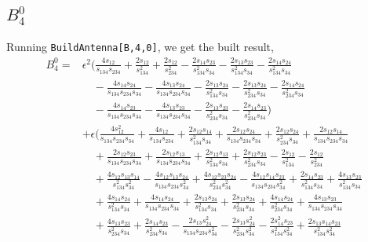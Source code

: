 \subsection{$B_4^0$}

Running \texttt{BuildAntenna[B,4,0]}, we get the built result,
\begin{align}
    B_4^0 = {}
    & \epsilon^2 \Bigg(
  \frac{4s_{12}}{s_{134}s_{234}} + \frac{2s_{12}}{s_{134}^2} + \frac{2s_{12}}{s_{234}^2} - \frac{2s_{14}s_{23}}{s_{134}^2s_{34}} - \frac{2s_{13}s_{23}}{s_{134}^2s_{34}} - \frac{2s_{14}s_{24}}{s_{134}^2s_{34}} \nonumber \\
  & \quad - \frac{4s_{14}s_{24}}{s_{134}s_{234}s_{34}} - \frac{4s_{13}s_{24}}{s_{134}s_{234}s_{34}} - \frac{2s_{13}s_{24}}{s_{134}^2s_{34}} - \frac{2s_{13}s_{24}}{s_{234}^2s_{34}} - \frac{2s_{14}s_{24}}{s_{234}^2s_{34}} \nonumber \\
  & \quad - \frac{4s_{14}s_{23}}{s_{134}s_{234}s_{34}} - \frac{4s_{13}s_{23}}{s_{134}s_{234}s_{34}} - \frac{2s_{13}s_{23}}{s_{234}^2s_{34}} - \frac{2s_{14}s_{23}}{s_{234}^2s_{34}} \Bigg) \nonumber \\
& + \epsilon \Bigg(
  \frac{4s_{12}^2}{s_{134}s_{234}s_{34}} + \frac{4s_{12}}{s_{134}s_{234}} + \frac{2s_{12}s_{14}}{s_{134}^2s_{34}} + \frac{2s_{12}s_{24}}{s_{134}s_{234}s_{34}} + \frac{2s_{12}s_{24}}{s_{234}^2s_{34}} + \frac{2s_{12}s_{14}}{s_{134}s_{234}s_{34}} \nonumber \\
  & \quad + \frac{2s_{12}s_{23}}{s_{134}s_{234}s_{34}} + \frac{2s_{12}s_{13}}{s_{134}s_{234}s_{34}} + \frac{2s_{12}s_{13}}{s_{134}^2s_{34}} + \frac{2s_{12}s_{23}}{s_{234}^2s_{34}} - \frac{2s_{12}}{s_{134}^2} - \frac{2s_{12}}{s_{234}^2} \nonumber \\
  & \quad + \frac{4s_{12}s_{13}s_{14}}{s_{134}^2s_{34}^2} - \frac{4s_{12}s_{13}s_{24}}{s_{134}s_{234}s_{34}^2} + \frac{4s_{12}s_{23}s_{24}}{s_{234}^2s_{34}^2} - \frac{4s_{12}s_{14}s_{23}}{s_{134}s_{234}s_{34}^2} + \frac{2s_{14}s_{23}}{s_{134}^2s_{34}} + \frac{4s_{13}s_{23}}{s_{134}^2s_{34}} \nonumber \\
  & \quad + \frac{4s_{14}s_{24}}{s_{134}^2s_{34}} + \frac{4s_{14}s_{24}}{s_{134}s_{234}s_{34}} + \frac{2s_{13}s_{24}}{s_{134}^2s_{34}} + \frac{2s_{13}s_{24}}{s_{234}^2s_{34}} + \frac{4s_{14}s_{24}}{s_{234}^2s_{34}} + \frac{4s_{13}s_{23}}{s_{134}s_{234}s_{34}} \nonumber \\
  & \quad + \frac{4s_{13}s_{23}}{s_{234}^2s_{34}} + \frac{2s_{14}s_{23}}{s_{234}^2s_{34}} - \frac{2s_{13}s_{24}^2}{s_{134}s_{234}s_{34}^2} - \frac{2s_{13}s_{24}^2}{s_{234}^2s_{34}^2} - \frac{2s_{14}^2s_{23}}{s_{134}^2s_{34}^2} + \frac{2s_{13}s_{14}s_{23}}{s_{134}^2s_{34}^2} \nonumber \\

\end{align}
